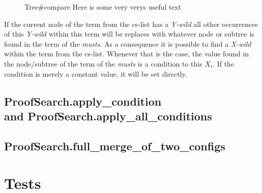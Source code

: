 \begin{figure}[H]
	\vspace{-10pt}
	
	\vspace{-10pt}
\end{figure}
\begin{figure}[H]
	\vspace{-10pt}
	
	\vspace{-10pt}
	\caption{Tree\#compare Here is some very verys useful text}
	\vspace{-10pt}
\end{figure}

If the current node of the term from the cs-list has a \emph{Y-wild} all other occurrences of this \emph{Y-wild} within this term will be replaces with whatever node or subtree is found in the term of the \emph{musts}. As a consequence it is possible to find a \emph{X-wild} within the term from the cs-list. Whenever that is the case, the value found in the node/subtree of the term of the \emph{musts} is a condition to this $X_i$. If the condition is merely a constant value, it will be set directly.

\subsection[ProofSearch.apply\_condition and ProofSearch.apply\_all\_conditions]{ProofSearch.apply\_condition \\and ProofSearch.apply\_all\_conditions}
\subsection{ProofSearch.full\_merge\_of\_two\_configs}

\section{Tests}
